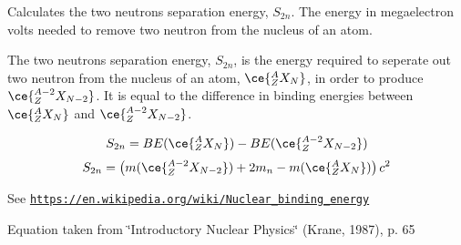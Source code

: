 Calculates the two neutrons separation energy, $S_{2n}$. The energy in megaelectron volts needed to remove two neutron from the nucleus of an atom. 

The two neutrons separation energy, $S_{2n}$, is the energy required to seperate out two neutron from the nucleus of an atom, $\ce{ ^{A}_{Z}X_{N} }$, in order to produce $\ce{ ^{A-2}_{Z}X_{N-2} }$. It is equal to the difference in binding energies between $\ce{ ^{A}_{Z}X_{N} }$ and $\ce{ ^{A-2}_{Z}X_{N-2} }$.

\[S_{2n} = BE(\ce{ ^{A}_{Z}X_{N} }) - BE(\ce{ ^{A-2}_{Z}X_{N-2} })\] \[S_{2n} = \left ( m(\ce{ ^{A-2}_{Z}X_{N-2} }) + 2 m_n - m(\ce{ ^{A}_{Z}X_{N} }) \right ) c^2\]

See \href{https://en.wikipedia.org/wiki/Nuclear_binding_energy}{\tt https\+://en.\+wikipedia.\+org/wiki/\+Nuclear\+\_\+binding\+\_\+energy}

Equation taken from \char`\"{}\+Introductory Nuclear Physics\char`\"{} (Krane, 1987), p. 65


